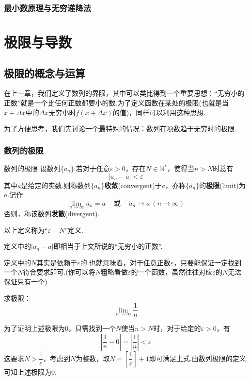 \documentclass[lang=cn, zihao=5]{elegantbook}
\newcommand{\cor}{~\textit{或}~}
\begin{document}
\subsection{最小数原理与无穷递降法}

\chapter{极限与导数}

\section{极限的概念与运算}

在上一章，我们定义了数列的界限，其中可以类比得到一个重要思想：“无穷小的正数”就是一个比任何正数都要小的数.为了定义函数在某处的极限(也就是当$x+\Delta x$中的$\Delta x$无穷小时$f(x+\Delta x)$的值)，同样可以利用这种思想.

为了方便思考，我们先讨论一个最特殊的情况：数列在项数趋于无穷时的极限.

\subsection{数列的极限}

\begin{definition}{数列的极限}
	设数列$\{ a_n \}$.若对于任意$\varepsilon >0$，存在$N \in \mathbb{N}^{*}$，使得当$n > N$时总有$$|a_n-a|<\varepsilon$$
	其中$a$是给定的实数.则称数列$\{ a_n \}$\textbf{收敛}(convergent)于$a$，亦称$\{ a_n \}$的\textbf{极限}(limit)为$a$.记作$$\lim_{n \to \infty}{a_n}=a \quad \cor \quad a_n \to a~(n \to \infty)$$
	否则，称该数列\textbf{发散}(divergent).
\end{definition}
\begin{remark}
	以上定义称为“$\varepsilon - N$”定义.
\end{remark}
\begin{remark}
	定义中的$|a_n-a|$即相当于上文所说的“无穷小的正数”.
\end{remark}
\begin{remark}
	定义中的$N$其实是依赖于$\varepsilon$的.也就意味着，对于任意正数$\varepsilon$，只要能保证一定找到一个$N$符合要求即可.(你可以将$N$粗略看做$\varepsilon$的一个函数，虽然往往对应$\varepsilon$的$N$无法保证只有一个)
\end{remark}

\begin{example}
	求极限：$$\lim_{n \to \infty} \frac{1}{n}$$
\end{example}
\begin{solution}
	为了证明上述极限为$0$，只需找到一个$N$使当$n > N$时，对于给定的$\varepsilon > 0$，有$$\left| \frac{1}{n}-0 \right| = \left| \frac{1}{n} \right| < \varepsilon$$
	这要求$N>\dfrac{1}{\varepsilon}$，考虑到$N$为整数，取$N=\left[ \dfrac{1}{\varepsilon} \right]+1$即可满足上式.由数列极限的定义可知上述极限为$0$.
\end{solution}
\end{document}
